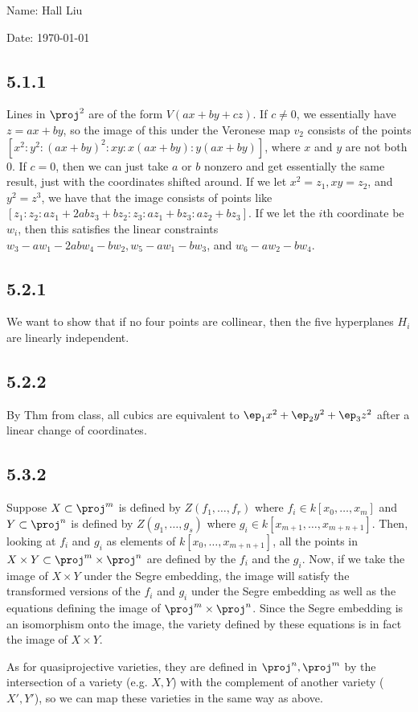 \documentclass{article}
\begin{document}
Name: Hall Liu

Date: \today 
\vspace{1.5cm}
\subsection*{5.1.1}
Lines in $\proj^2$ are of the form $V(ax+by+cz)$. If $c\neq0$, we essentially have $z=ax+by$, so the image of this under the Veronese map $v_2$ consists of the points $[x^2:y^2:(ax+by)^2:xy:x(ax+by):y(ax+by)]$, where $x$ and $y$ are not both $0$. If $c=0$, then we can just take $a$ or $b$ nonzero and get essentially the same result, just with the coordinates shifted around. If we let $x^2=z_1,xy=z_2$, and $y^2=z^3$, we have that the image consists of points like $[z_1:z_2:az_1+2abz_3+bz_2:z_3:az_1+bz_3:az_2+bz_3]$. If we let the $i$th coordinate be $w_i$, then this satisfies the linear constraints $w_3-aw_1-2abw_4-bw_2,w_5-aw_1-bw_3$, and $w_6-aw_2-bw_4$.
\subsection*{5.2.1}
We want to show that if no four points are collinear, then the five hyperplanes $H_i$ are linearly independent. 
\subsection*{5.2.2}
By Thm from class, all cubics are equivalent to $\ep_1x^2+\ep_2y^2+\ep_3z^2$ after a linear change of coordinates. 
\subsection*{5.3.2}
Suppose $X\subset \proj^m$ is defined by $Z(f_1,\ldots,f_r)$ where $f_i\in k[x_0,\ldots,x_m]$ and $Y\subset \proj^n$ is defined by $Z(g_1,\ldots,g_s)$ where $g_i\in k[x_{m+1},\ldots,x_{m+n+1}]$. Then, looking at $f_i$ and $g_i$ as elements of $k[x_0,\ldots,x_{m+n+1}]$, all the points in $X\times Y\subset \proj^m\times\proj^n$ are defined by the $f_i$ and the $g_i$. Now, if we take the image of $X\times Y$ under the Segre embedding, the image will satisfy the transformed versions of the $f_i$ and $g_i$ under the Segre embedding as well as the equations defining the image of $\proj^m\times\proj^n$. Since the Segre embedding is an isomorphism onto the image, the variety defined by these equations is in fact the image of $X\times Y$.

As for quasiprojective varieties, they are defined in $\proj^n,\proj^m$ by the intersection of a variety (e.g. $X,Y$) with the complement of another variety ($X',Y'$), so we can map these varieties in the same way as above.
\end{document}

